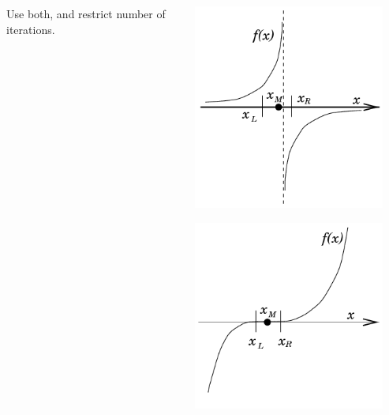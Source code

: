 \documentclass{beamer}
\begin{document}
\begin{frame}
\begin{columns}
\begin{column}{0.5\textwidth}
\begin{overlayarea}{\textwidth}{0.6\textheight}
{          Use both, and restrict number of iterations.
        }
      \end{overlayarea}
    \end{column}
    \begin{column}{0.475\textwidth}
      \begin{overlayarea}{\textwidth}{0.6\textheight}
        {
          \begin{center}
            \includegraphics[width=0.9\textwidth]{figures/bisec_stop_1}
          \end{center}
        }
        {
          \begin{center}
            \includegraphics[width=0.9\textwidth]{figures/bisec_stop_2}

\end{center}}
\end{overlayarea}
\end{column}
\end{columns}
\end{frame}
\end{document}
